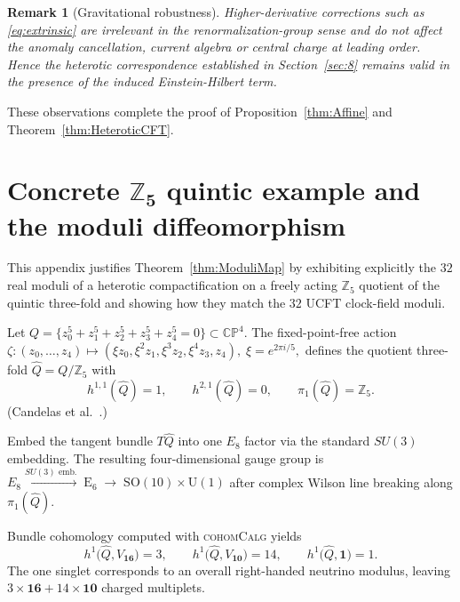 \documentclass[pdflatex,sn-mathphys-num]{sn-jnl}
\theoremstyle{thmstyleone}
\theoremstyle{thmstyletwo}%
\newtheorem{remark}{Remark}%
\theoremstyle{thmstylethree}%
\newcommand{\SO}[1]{\mathrm{SO(#1)}}
\newcommand{\U}[1]{\mathrm{U(#1)}}
\newcommand{\E}[1]{\mathrm{E_{#1}}}
\newcommand{\SOTen}{\SO{10}}
\newcommand{\UOne}{\U{1}}
\newcommand{\ESix}{\E{6}}
\begin{document}
\begin{appendices}
\begin{remark}[Gravitational robustness]
Higher-derivative corrections such as \eqref{eq:extrinsic} are irrelevant
in the renormalization-group sense and do not affect the anomaly
cancellation, current algebra or central charge at leading order.
Hence the heterotic correspondence established in
Section~\ref{sec:8} remains valid in the presence of the
induced Einstein-Hilbert term.
\end{remark}

\bigskip
These observations complete the proof of
Proposition~\ref{thm:Affine} and
Theorem~\ref{thm:HeteroticCFT}.

\section{Concrete $\boldsymbol{\mathbb Z_{5}}$ quintic example and
         the moduli diffeomorphism}
\label{app:CY}
This appendix justifies Theorem~\ref{thm:ModuliMap} by exhibiting
explicitly the $32$ real moduli of a heterotic compactification on a
freely acting $\mathbb Z_{5}$ quotient of the quintic three-fold and
showing how they match the $32$ UCFT clock-field moduli.

Let $Q=\bigl\{z_{0}^{5}+z_{1}^{5}+z_{2}^{5}+z_{3}^{5}+z_{4}^{5}=0
              \bigr\}\subset\mathbb{CP}^{4}$.
The fixed-point-free action
\(
  \zeta : (z_{0},\ldots,z_{4})
  \mapsto
  (\xi z_{0},\xi^{2}z_{1},\xi^{3}z_{2},\xi^{4}z_{3},z_{4}),
  \;
  \xi=e^{2\pi i/5},
\)
defines the quotient three-fold
\(
  \widehat Q = Q/\mathbb Z_{5}
\)
with
\begin{equation}
  h^{1,1}(\widehat Q)=1,
  \qquad
  h^{2,1}(\widehat Q)=0,
  \qquad
  \pi_{1}(\widehat Q)=\mathbb Z_{5}.
\tag{CY.1}\label{eq:hodge}
\end{equation}
(Candelas et al.\ \cite{CandelasQuintic:1990}.)

Embed the tangent bundle $T\widehat Q$ into one $E_{8}$ factor via the
standard $SU(3)$ embedding.  The resulting four-dimensional gauge group
is
\(
  E_{8}\xrightarrow{SU(3)\text{ emb.}}\;
  \ESix\;\longrightarrow\;\SOTen\times \UOne
\)
after complex Wilson line breaking along $\pi_{1}(\widehat Q)$.

Bundle cohomology computed with
\textsc{cohomCalg} \cite{Blumenhagen:2010} yields
\begin{equation}
  h^{1}\bigl(\widehat Q,V_{\mathbf{16}}\bigr)=3,
  \qquad
  h^{1}\bigl(\widehat Q,V_{\mathbf{10}}\bigr)=14,
  \qquad
  h^{1}\bigl(\widehat Q,\mathbf 1\bigr)=1.
\tag{CY.2}\label{eq:bundle}
\end{equation}
The one singlet corresponds to an overall right-handed neutrino
modulus, leaving
\(3\times\mathbf{16}+14\times\mathbf{10}\) charged multiplets.


\end{appendices}
\end{document}

